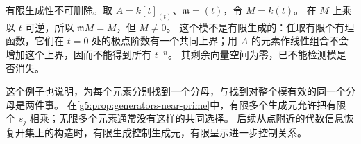 \ProseParagraphBreak

有限生成性不可删除。取 \(A=k[t]_{(t)}\)、\(\mathfrak m=(t)\)，令 \(M=k(t)\)。
	在 \(M\) 上乘以 \(t\) 可逆，所以 \(\mathfrak mM=M\)，但 \(M\ne0\)。 这个模不是有限生成的：任取有限个有理函数，它们在 \(t=0\) 处的极点阶数有一个共同上界；用 \(A\) 的元素作线性组合不会增加这个上界，因而不能得到所有 \(t^{-n}\)。 其剩余向量空间为零，已不能检测模是否消失。

\ProseParagraphBreak

这个例子也说明，为每个元素分别找到一个分母，与找到对整个模有效的同一个分母是两件事。
	在\cref{g5:prop:generators-near-prime}中，有限多个生成元允许把有限个 \(s_j\) 相乘；无限多个元素通常没有这样的共同选择。 后续从点附近的代数信息恢复开集上的构造时，有限生成控制生成元，有限呈示进一步控制关系。

